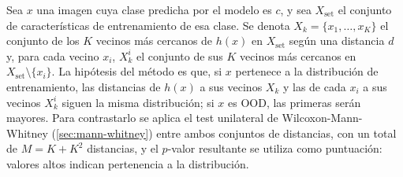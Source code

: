 Sea $x$ una imagen cuya clase predicha por el modelo es $c$, y sea $X_{\mathrm{set}}$ el conjunto de características de entrenamiento de esa clase. Se denota $X_k = \{x_1, \ldots, x_K\}$ el conjunto de los $K$ vecinos más cercanos de $h(x)$ en $X_{\mathrm{set}}$ según una distancia $d$ y, para cada vecino $x_i$, $X_k^{i}$ el conjunto de sus $K$ vecinos más cercanos en $X_{\mathrm{set}} \setminus \{x_i\}$. La hipótesis del método es que, si $x$ pertenece a la distribución de entrenamiento, las distancias de $h(x)$ a sus vecinos $X_k$ y las de cada $x_i$ a sus vecinos $X_k^{i}$ siguen la misma distribución; si $x$ es OOD, las primeras serán mayores. Para contrastarlo se aplica el test unilateral de Wilcoxon-Mann-Whitney (\cref{sec:mann-whitney}) entre ambos conjuntos de distancias, con un total de $M = K + K^2$ distancias, y el $p$-valor resultante se utiliza como puntuación: valores altos indican pertenencia a la distribución.

